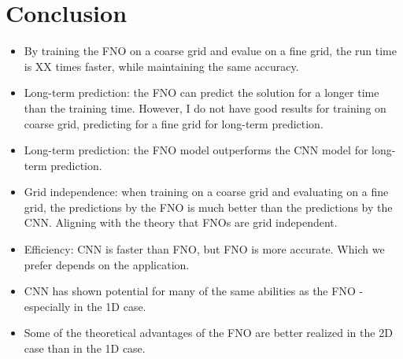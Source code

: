 \chapter{Conclusion}\label{ch:conclusion}


\begin{itemize}
    \item By training the FNO on a coarse grid and evalue on a fine grid, the run time is XX times faster, while maintaining the same accuracy.
    \item Long-term prediction: the FNO can predict the solution for a longer time than the training time. However, I do not have good results for training on coarse grid, predicting for a fine grid for long-term prediction.
    \item Long-term prediction: the FNO model outperforms the CNN model for long-term prediction.
    \item Grid independence: when training on a coarse grid and evaluating on a fine grid, the predictions by the FNO is much better than the predictions by the CNN. Aligning with the theory that FNOs are grid independent.
    \item Efficiency: CNN is faster than FNO, but FNO is more accurate. Which we prefer depends on the application.
    \item CNN has shown potential for many of the same abilities as the FNO - especially in the 1D case.
    \item Some of the theoretical advantages of the FNO are better realized in the 2D case than in the 1D case.
\end{itemize}





